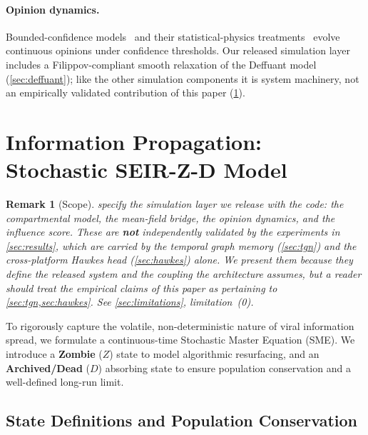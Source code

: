\documentclass[11pt]{article}
\newtheorem{remark}{Remark}
\begin{document}
\paragraph{Opinion dynamics.}
Bounded-confidence models~\citep{deffuant2000mixing,hegselmann2002opinion} and
their statistical-physics treatments~\citep{castellano2009statistical} evolve
continuous opinions under confidence thresholds. Our released simulation layer
includes a Filippov-compliant smooth relaxation of the Deffuant model
(\cref{sec:deffuant}); like the other simulation components it is system
machinery, not an empirically validated contribution of this paper
(\cref{rem:scope}).

\section{Information Propagation: Stochastic SEIR-Z-D Model}
\label{sec:seir}

\begin{remark}[Scope]
\label{rem:scope}
 specify the \emph{simulation
layer} we release with the code: the compartmental model, the mean-field
bridge, the opinion dynamics, and the influence score. These are \textbf{not}
independently validated by the experiments in \cref{sec:results}, which are
carried by the temporal graph memory (\cref{sec:tgn}) and the cross-platform
Hawkes head (\cref{sec:hawkes}) alone. We present them because they define the
released system and the coupling the architecture assumes, but a reader should
treat the empirical claims of this paper as pertaining to
\cref{sec:tgn,sec:hawkes}. See \cref{sec:limitations}, limitation~(0).
\end{remark}

To rigorously capture the volatile, non-deterministic nature of viral information
spread, we formulate a continuous-time Stochastic Master Equation (SME). We
introduce a \textbf{Zombie} ($Z$) state to model algorithmic resurfacing, and an
\textbf{Archived/Dead} ($D$) absorbing state to ensure population conservation
and a well-defined long-run limit.

\subsection{State Definitions and Population Conservation}
\end{document}
